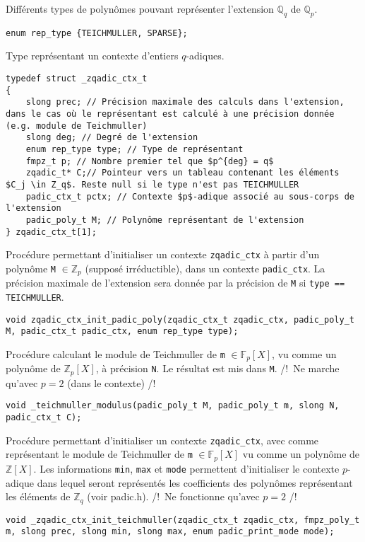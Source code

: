 \documentclass[11pt]{article}
\begin{document}
Différents types de polynômes pouvant représenter l'extension $\mathbb{Q}_q$ de $\mathbb{Q}_p$. 
\begin{verbatim}
enum rep_type {TEICHMULLER, SPARSE};
\end{verbatim}

Type représentant un contexte d'entiers $q$-adiques.
\begin{verbatim}
typedef struct _zqadic_ctx_t
{
    slong prec; // Précision maximale des calculs dans l'extension, dans le cas où le représentant est calculé à une précision donnée (e.g. module de Teichmuller)
    slong deg; // Degré de l'extension
    enum rep_type type; // Type de représentant
    fmpz_t p; // Nombre premier tel que $p^{deg} = q$
    zqadic_t* C;// Pointeur vers un tableau contenant les éléments $C_j \in Z_q$. Reste null si le type n'est pas TEICHMULLER
    padic_ctx_t pctx; // Contexte $p$-adique associé au sous-corps de l'extension
    padic_poly_t M; // Polynôme représentant de l'extension
} zqadic_ctx_t[1];
\end{verbatim}

Procédure permettant d'initialiser un contexte \texttt{zqadic_ctx} à partir d'un polynôme \texttt{M} $\in \mathbb{Z}_p$ (supposé irréductible), dans un contexte \texttt{padic_ctx}. La précision maximale de l'extension sera donnée par la précision de \texttt{M} si \texttt{type == TEICHMULLER}. 
\begin{verbatim}
void zqadic_ctx_init_padic_poly(zqadic_ctx_t zqadic_ctx, padic_poly_t M, padic_ctx_t padic_ctx, enum rep_type type);
\end{verbatim}

Procédure calculant le module de Teichmuller de \texttt{m} $\in \mathbb{F}_p[X]$, vu comme un polynôme de $\mathbb{Z}_p[X]$, à précision \texttt{N}. Le résultat est mis dans \texttt{M}. /!\ Ne marche qu'avec $p = 2$ (dans le contexte) /!\ 
\begin{verbatim}
void _teichmuller_modulus(padic_poly_t M, padic_poly_t m, slong N, padic_ctx_t C);
\end{verbatim}

Procédure permettant d'initialiser un contexte \texttt{zqadic_ctx}, avec comme représentant le module de Teichmuller de \texttt{m} $\in \mathbb{F}_p[X]$ vu comme un polynôme de $\mathbb{Z}[X]$. Les informations \texttt{min}, \texttt{max} et \texttt{mode} permettent d'initialiser le contexte $p$-adique dans lequel seront représentés les coefficients des polynômes représentant les éléments de $\mathbb{Z}_q$ (voir padic.h). /!\ Ne fonctionne qu'avec $p = 2$ /!\  
\begin{verbatim}
void _zqadic_ctx_init_teichmuller(zqadic_ctx_t zqadic_ctx, fmpz_poly_t m, slong prec, slong min, slong max, enum padic_print_mode mode);
\end{verbatim}
\end{document}
